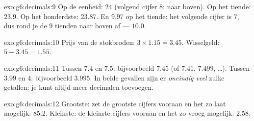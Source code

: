 \begin{solution}{exo:g6:decimals:9}
Op de eenheid: $24$ (volgend cijfer $8$: naar boven). Op het tiende: $23.9$.
Op het honderdste: $23.87$. En $9.97$ op het tiende: het volgende cijfer is
$7$, dus rond je de $9$ tienden naar boven af --- $10.0$.
\end{solution}

\begin{solution}{exo:g6:decimals:10}
Prijs van de stokbroden: $3 \times 1.15 = 3.45$. Wisselgeld:
$5 - 3.45 = 1.55$.
\end{solution}

\begin{solution}{exo:g6:decimals:11}
Tussen $7.4$ en $7.5$: bijvoorbeeld $7.45$ (of $7.41$, $7.499$, \dots).
Tussen $3.99$ en $4$: bijvoorbeeld $3.995$. In beide gevallen zijn er
\emph{oneindig veel} zulke getallen: je kunt altijd meer decimalen toevoegen.
\end{solution}

\begin{solution}{exo:g6:decimals:12}
Grootste: zet de grootste cijfers vooraan en het  zo laat
mogelijk: $85.2$. Kleinste: de kleinste cijfers vooraan en het 
zo vroeg mogelijk: $2.58$.
\end{solution}

